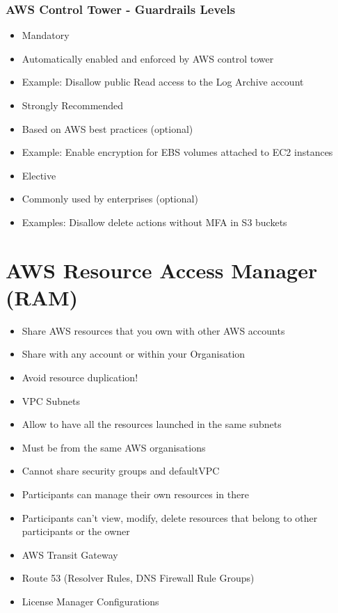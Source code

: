 \subsubsection{AWS Control Tower - Guardrails Levels}
\begin{itemize}
    \item Mandatory
    \item Automatically enabled and enforced by AWS control tower
    \item Example: Disallow public Read access to the Log Archive account
    \item Strongly Recommended
    \item Based on AWS best practices (optional)
    \item Example: Enable encryption for EBS volumes attached to EC2 instances
    \item Elective
    \item Commonly used by enterprises (optional)
    \item Examples: Disallow delete actions without MFA in S3 buckets
\end{itemize}


\section{AWS Resource Access Manager (RAM)}
\begin{itemize}
    \item Share AWS resources that you own with other AWS accounts
    \item Share with any account or within your Organisation
    \item Avoid resource duplication!
    \item VPC Subnets
    \item Allow to have all the resources launched in the same subnets
    \item Must be from the same AWS organisations
    \item Cannot share security groups and defaultVPC
    \item Participants can manage their own resources in there
    \item Participants can't view, modify, delete resources that belong to other participants or the owner
    \item AWS Transit Gateway
    \item Route 53 (Resolver Rules, DNS Firewall Rule Groups)
    \item License Manager Configurations
\end{itemize}

